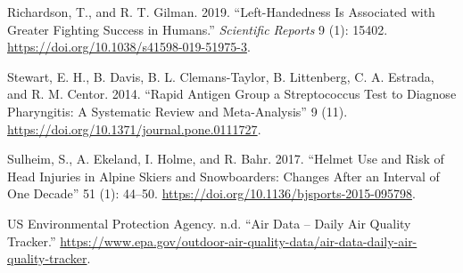 \documentclass[
]{report}
\newlength{\cslhangindent}
\newenvironment{CSLReferences}[2] %
 {%
  \setlength{\parindent}{0pt}
  \ifodd #1 \everypar{\setlength{\hangindent}{\cslhangindent}}\ignorespaces\fi
  \ifnum #2 > 0
  \setlength{\parskip}{#2\baselineskip}
  \fi
 }%
 {}
\begin{document}
\begin{CSLReferences}{1}{0}
\leavevmode{}%
Richardson, T., and R. T. Gilman. 2019. {``Left-Handedness Is Associated with Greater Fighting Success in Humans.''} \emph{Scientific Reports} 9 (1): 15402. \url{https://doi.org/10.1038/s41598-019-51975-3}.

\leavevmode{}%
Stewart, E. H., B. Davis, B. L. Clemans-Taylor, B. Littenberg, C. A. Estrada, and R. M. Centor. 2014. {``Rapid Antigen Group a Streptococcus Test to Diagnose Pharyngitis: A Systematic Review and Meta-Analysis''} 9 (11). \url{https://doi.org/10.1371/journal.pone.0111727}.

\leavevmode{}%
Sulheim, S., A. Ekeland, I. Holme, and R. Bahr. 2017. {``Helmet Use and Risk of Head Injuries in Alpine Skiers and Snowboarders: Changes After an Interval of One Decade''} 51 (1): 44--50. \url{https://doi.org/10.1136/bjsports-2015-095798}.

\leavevmode{}%
US Environmental Protection Agency. n.d. {``Air Data -- Daily Air Quality Tracker.''} \url{https://www.epa.gov/outdoor-air-quality-data/air-data-daily-air-quality-tracker}.

\end{CSLReferences}
\end{document}
